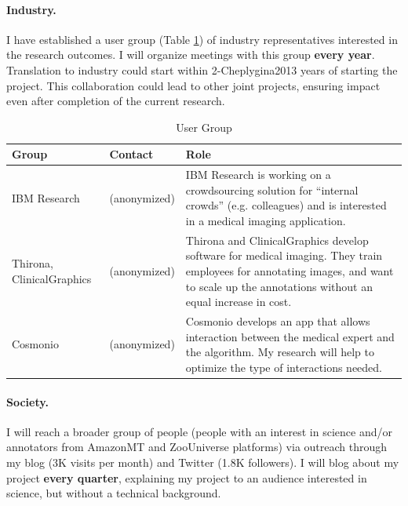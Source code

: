 \documentclass[serif, twocolumn, numeric, rga]{jote-article}
\begin{document}
\paragraph{Industry.}

\noindent I have established a user group (Table \ref{tab:usergroup}) of industry representatives interested in the research outcomes. I will organize meetings with this group \textbf{every year}. Translation to industry could start within 2-Cheplygina2013 years of starting the project. This collaboration could lead to other joint projects, ensuring impact even after completion of the current research.



\begin{table}[h]\sffamily
\begin{tabular}{p{}p{}p{}}
\toprule
\textbf{Group}   & \textbf{Contact}   & \textbf{Role}                                                                                                                                                                                           \\ \midrule
IBM Research     & (anonymized)   & IBM Research is working on a crowdsourcing solution for “internal crowds” (e.g. colleagues) and is interested in a medical imaging application.                                                         \\
Thirona, ClinicalGraphics        & (anonymized)   & Thirona and ClinicalGraphics develop software for medical imaging. They train employees for annotating images, and want to scale up the annotations without an equal increase in cost. \\
Cosmonio         & (anonymized) & Cosmonio develops an app that allows interaction between the medical expert and the algorithm. My research will help to optimize the type of interactions needed.                                       \\ \bottomrule
\end{tabular}
\caption{User Group}
\label{tab:usergroup}
\vspace{-\baselineskip}
\end{table}

\paragraph{Society.}

I will reach a broader group of people (people with an interest in science and/or annotators from AmazonMT and ZooUniverse platforms) via outreach through my blog (3K visits per month) and Twitter (1.8K followers). I will blog about my project \textbf{every quarter}, explaining my project to an audience interested in science, but without a technical background.
\end{document}
